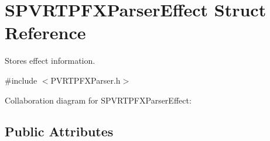 \hypertarget{struct_s_p_v_r_t_p_f_x_parser_effect}{\section{S\+P\+V\+R\+T\+P\+F\+X\+Parser\+Effect Struct Reference}
\label{struct_s_p_v_r_t_p_f_x_parser_effect}
}


Stores effect information.  




{\ttfamily \#include $<$P\+V\+R\+T\+P\+F\+X\+Parser.\+h$>$}



Collaboration diagram for S\+P\+V\+R\+T\+P\+F\+X\+Parser\+Effect\+:
\subsection*{Public Attributes}
